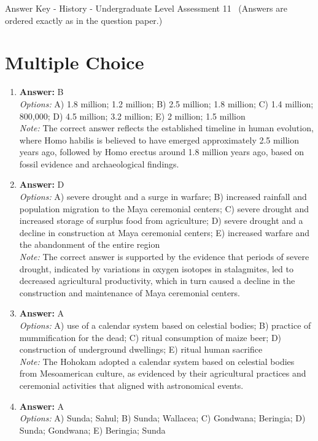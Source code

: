 \documentclass[12pt]{article}
\begin{document}
\begin{center}
Answer Key - History - Undergraduate Level Assessment 11 \
\small (Answers are ordered exactly as in the question paper.)
\end{center}

\section*{Multiple Choice}
\begin{enumerate}[label=\arabic*.]
\item \textbf{Answer:} B
\\ \textit{Options:} A) 1.8 million; 1.2 million; B) 2.5 million; 1.8 million; C) 1.4 million; 800,000; D) 4.5 million; 3.2 million; E) 2 million; 1.5 million
\\ \textit{Note:} The correct answer reflects the established timeline in human evolution, where Homo habilis is believed to have emerged approximately 2.5 million years ago, followed by Homo erectus around 1.8 million years ago, based on fossil evidence and archaeological findings.
\item \textbf{Answer:} D
\\ \textit{Options:} A) severe drought and a surge in warfare; B) increased rainfall and population migration to the Maya ceremonial centers; C) severe drought and increased storage of surplus food from agriculture; D) severe drought and a decline in construction at Maya ceremonial centers; E) increased warfare and the abandonment of the entire region
\\ \textit{Note:} The correct answer is supported by the evidence that periods of severe drought, indicated by variations in oxygen isotopes in stalagmites, led to decreased agricultural productivity, which in turn caused a decline in the construction and maintenance of Maya ceremonial centers.
\item \textbf{Answer:} A
\\ \textit{Options:} A) use of a calendar system based on celestial bodies; B) practice of mummification for the dead; C) ritual consumption of maize beer; D) construction of underground dwellings; E) ritual human sacrifice
\\ \textit{Note:} The Hohokam adopted a calendar system based on celestial bodies from Mesoamerican culture, as evidenced by their agricultural practices and ceremonial activities that aligned with astronomical events.
\item \textbf{Answer:} A
\\ \textit{Options:} A) Sunda; Sahul; B) Sunda; Wallacea; C) Gondwana; Beringia; D) Sunda; Gondwana; E) Beringia; Sunda

\end{enumerate}
\end{document}
